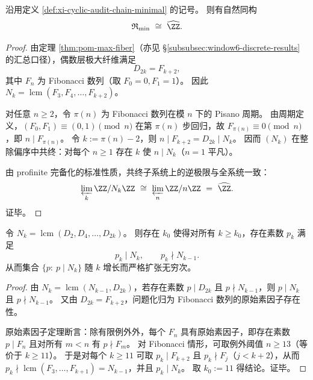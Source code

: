 \begin{theorem}\label{thm:xi-rmin-is-zhat}
沿用定义 \ref{def:xi-cyclic-audit-chain-minimal} 的记号。
则有自然同构
\[
\mathfrak R_{\min}\ \cong\ \widehat{\ZZ}.
\]
\end{theorem}
\begin{proof}
由定理 \ref{thm:pom-max-fiber}（亦见 \S\ref{subsubsec:window6-discrete-results} 的汇总口径），偶数层极大纤维满足
\[
D_{2k}=F_{k+2},
\]
其中 \(F_n\) 为 Fibonacci 数列（取 \(F_0=0,F_1=1\)）。
因此 \(N_k=\operatorname{lcm}(F_3,F_4,\dots,F_{k+2})\)。

对任意 \(n\ge 2\)，令 \(\pi(n)\) 为 Fibonacci 数列在模 \(n\) 下的 Pisano 周期。
由周期定义，\((F_0,F_1)\equiv(0,1)\pmod n\) 在第 \(\pi(n)\) 步回归，故 \(F_{\pi(n)}\equiv 0\pmod n\)，即 \(n\mid F_{\pi(n)}\)。
令 \(k:=\pi(n)-2\)，则 \(n\mid F_{k+2}=D_{2k}\mid N_k\)。
因而 \((N_k)\) 在整除偏序中共终：对每个 \(n\ge 1\) 存在 \(k\) 使 \(n\mid N_k\)（\(n=1\) 平凡）。

由 profinite 完备化的标准性质，共终子系统上的逆极限与全系统一致：
\[
\varprojlim_{k}\ZZ/N_k\ZZ\ \cong\ \varprojlim_{n}\ZZ/n\ZZ\ =\ \widehat{\ZZ}.
\]
证毕。
\end{proof}

\begin{theorem}\label{thm:xi-primitive-prime-divisor-forces-unbounded-prime-support}
令 \(N_k=\operatorname{lcm}(D_2,D_4,\dots,D_{2k})\)。
则存在 \(k_0\) 使得对所有 \(k\ge k_0\)，存在素数 \(p_k\) 满足
\[
p_k\mid N_k,
\qquad
p_k\nmid N_{k-1}.
\]
从而集合 \(\{p:\ p\mid N_k\}\) 随 \(k\) 增长而严格扩张无穷次。
\end{theorem}
\begin{proof}
由 \(N_k=\operatorname{lcm}(N_{k-1},D_{2k})\)，若存在素数 \(p\mid D_{2k}\) 且 \(p\nmid N_{k-1}\)，则 \(p\mid N_k\) 且 \(p\nmid N_{k-1}\)。
又由 \(D_{2k}=F_{k+2}\)，问题化归为 Fibonacci 数列的原始素因子存在性。

原始素因子定理断言：除有限例外外，每个 \(F_n\) 具有原始素因子，即存在素数 \(p\mid F_n\) 且对所有 \(m<n\) 有 \(p\nmid F_m\)。
对 Fibonacci 情形，可取例外阈值 \(n\ge 13\)（等价于 \(k\ge 11\)）。
于是对每个 \(k\ge 11\) 可取 \(p_k\mid F_{k+2}\) 且 \(p_k\nmid F_j\)（\(j<k+2\)），从而 \(p_k\nmid \operatorname{lcm}(F_3,\dots,F_{k+1})=N_{k-1}\)，并且 \(p_k\mid N_k\)。
取 \(k_0:=11\) 得结论。证毕。
\end{proof}

